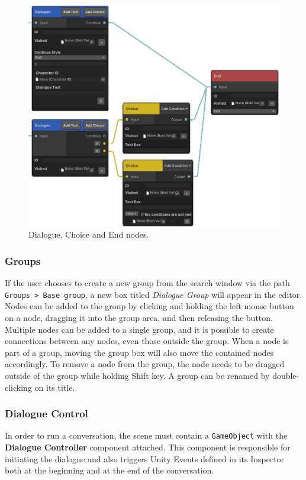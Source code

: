 \begin{figure}[H]
\centering
\includegraphics[width=1\linewidth]{img/User doc/nodes2.png}
\caption{Dialogue, Choice and End nodes.}
\label{fig:Manual-Nodes2}
\end{figure}

\subsubsection{Groups}
If the user chooses to create a new group from the search window via the path \verb|Groups > Base group|, a new box titled \textit{Dialogue Group} will appear in the editor. Nodes can be added to the group by clicking and holding the left mouse button on a node, dragging it into the group area, and then releasing the button. Multiple nodes can be added to a single group, and it is possible to create connections between any nodes, even those outside the group. When a node is part of a group, moving the group box will also move the contained nodes accordingly. To remove a node from the group, the node needs to be dragged outside of the group while holding Shift key. A group can be renamed by double-clicking on its title. 

\subsubsection{Dialogue Control}
In order to run a conversation, the scene must contain a \verb|GameObject| with the \textbf{Dialogue Controller} component attached. This component is responsible for initiating the dialogue and also triggers Unity Events defined in its Inspector both at the beginning and at the end of the conversation. 

